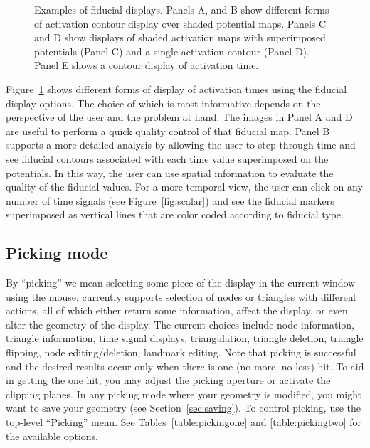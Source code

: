 \begin{figure}[htb]
  \begin{makeimage}
  \end{makeimage}
  \fidexamples
  \caption{\label{fig:fidexamples} Examples of fiducial displays.  Panels
    A, and B show different forms of activation contour display over shaded
    potential maps.  Panels C and D show displays of shaded activation maps
    with superimposed potentials (Panel C) and a single activation contour
    (Panel D).  Panel E shows a contour display of activation time. }
\end{figure}


Figure~\ref{fig:fidexamples} shows different forms of display of activation
times using the fiducial display options.  The choice of which is most
informative depends on the perspective of the user and the problem at hand.
The images in Panel A and D are useful to perform a quick quality control
of that fiducial map.  Panel B supports a more detailed analysis by
allowing the user to step through time and see fiducial contours associated
with each time value superimposed on the potentials.  In this way, the user
can use spatial information to evaluate the quality of the fiducial values.
For a more temporal view, the user can click on any number of time signals
(see Figure~\ref{fig:scalar}) and see the fiducial markers superimposed as
vertical lines that are color coded according to fiducial type.


\subsection{Picking mode}
\label{sec:control-picking} 

By ``picking'' we mean selecting some piece of the display in the current
window using the mouse.  \map{} currently supports selection of nodes or
triangles with different actions, all of which either return some
information, affect the display, or even alter the geometry of the display.
The current choices include node information, triangle information, time
signal displays, triangulation, triangle deletion, triangle flipping, node
editing/deletion, landmark editing.  Note that picking is successful and
the desired results occur only when there is one (no more, no less) hit.
To aid in getting the one hit, you may adjust the picking aperture or
activate the clipping planes.  In any picking mode where your geometry is
modified, you might want to save your geometry (see
Section~\ref{sec:saving}).  To control picking, use the top-level
``Picking'' menu. See Tables~\ref{table:pickingone} and
\ref{table:pickingtwo} for the available options.


